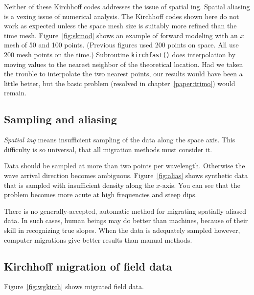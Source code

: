 \par
Neither of these Kirchhoff codes addresses the issue of spatial ing.
Spatial aliasing is a vexing issue of numerical analysis.
The Kirchhoff codes shown here do not work as expected
unless the space mesh size is suitably more refined than the time mesh.
Figure~\ref{fig:skmod} shows an example of forward modeling
with an $x$ mesh of 50 and 100 points. %
(Previous figures used 200 points on space.
All use 200 mesh points on the time.)
Subroutine \texttt{kirchfast()}  does interpolation by moving values
to the nearest neighbor of the theoretical location.
Had we taken the trouble to interpolate the two nearest points,
our results would have been a little better,
but the basic problem (resolved in chapter~\ref{paper:trimo}) would remain.

\subsection{Sampling and aliasing}
{\em 
Spatial ing
}
means insufficient sampling of the data along the space axis.
This difficulty is so universal, that all migration methods
must consider it.
\par
Data should be sampled at more than two points per wavelength.
Otherwise the wave arrival direction becomes ambiguous.
Figure~\ref{fig:alias} shows synthetic data that is
sampled with insufficient density along the $x$-axis.
You can see that the problem becomes more acute at high frequencies 
and steep dips.
\par
There is no generally-accepted, automatic method for migrating
spatially aliased data.
In such cases, human beings may do better than machines,
because of their skill in recognizing true slopes.
When the data is adequately sampled however, computer migrations
give better results than manual methods.

\subsection{Kirchhoff migration of field data}
Figure~\ref{fig:wgkirch} shows migrated field data.

